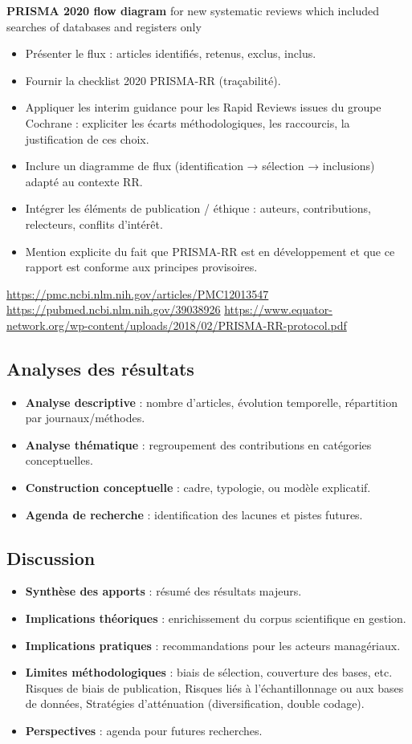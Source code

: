 \documentclass[a4paper,12pt]{article}
\begin{document}
\textbf{PRISMA 2020 flow diagram} for new systematic reviews which included searches of databases and registers only
\begin{itemize}
\item Présenter le flux : articles identifiés, retenus, exclus, inclus.
\item Fournir la checklist 2020 PRISMA-RR (traçabilité).
\item Appliquer les interim guidance pour les Rapid Reviews issues du groupe Cochrane : expliciter les écarts méthodologiques, les raccourcis, la justification de ces choix.
\item Inclure un diagramme de flux (identification → sélection → inclusions) adapté au contexte RR.
\item Intégrer les éléments de publication / éthique : auteurs, contributions, relecteurs, conflits d’intérêt.
\item Mention explicite du fait que PRISMA-RR est en développement et que ce rapport est conforme aux principes provisoires.
\end{itemize}
\url{https://pmc.ncbi.nlm.nih.gov/articles/PMC12013547}
\url{https://pubmed.ncbi.nlm.nih.gov/39038926}
\url{https://www.equator-network.org/wp-content/uploads/2018/02/PRISMA-RR-protocol.pdf}
\subsection{Analyses des résultats}
\label{sec:org23b554e}
\begin{itemize}
\item \textbf{\textbf{Analyse descriptive}} : nombre d’articles, évolution temporelle, répartition par journaux/méthodes.
\item \textbf{\textbf{Analyse thématique}} : regroupement des contributions en catégories conceptuelles.
\item \textbf{\textbf{Construction conceptuelle}} : cadre, typologie, ou modèle explicatif.
\item \textbf{\textbf{Agenda de recherche}} : identification des lacunes et pistes futures.
\end{itemize}
\subsection{Discussion}
\label{sec:org31624a3}
\begin{itemize}
\item \textbf{\textbf{Synthèse des apports}} : résumé des résultats majeurs.
\item \textbf{\textbf{Implications théoriques}} : enrichissement du corpus scientifique en gestion.
\item \textbf{\textbf{Implications pratiques}} : recommandations pour les acteurs managériaux.
\item \textbf{\textbf{Limites méthodologiques}} : biais de sélection, couverture des bases, etc. Risques de biais de publication, Risques liés à l’échantillonnage ou aux bases de données, Stratégies d’atténuation (diversification, double codage).
\item \textbf{\textbf{Perspectives}} : agenda pour futures recherches.
\end{itemize}
\end{document}
